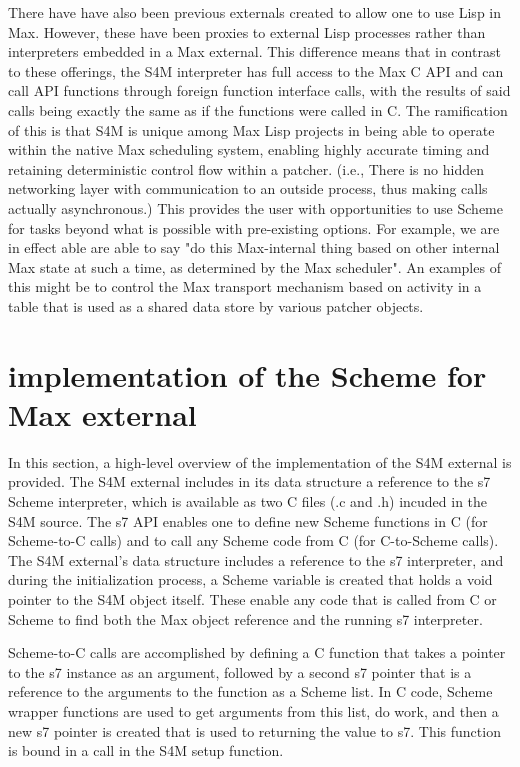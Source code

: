 \documentclass[acmsmall]{acmart}
\begin{document}
There have have also been previous externals created to allow one to use Lisp in Max. 
However, these have been proxies to external Lisp processes rather than interpreters embedded
in a Max external.
This difference means that in contrast to these offerings, the S4M interpreter has full 
access to the Max C API and can call API functions through foreign function interface
calls, with the results of said calls being exactly the same as if the functions were called in C. 
The ramification of this is that S4M is unique among Max Lisp projects in being
able to operate within the native Max scheduling system, enabling highly accurate
timing and retaining deterministic control flow within a patcher. (i.e., There
is no hidden networking layer with communication to an outside process, thus making
calls actually asynchronous.)
This provides the user with opportunities to use Scheme for tasks beyond
what is possible with pre-existing options. For example, we are in effect able 
are able to say "do this Max-internal thing based on other internal Max state at such a time,
as determined by the Max scheduler". An examples of this might be to control
the Max transport mechanism based on activity in a table that is used as a 
shared data store by various patcher objects. 


\section{implementation of the Scheme for Max external}

In this section, a high-level overview of the implementation of the S4M external is provided.
The S4M external includes in its data structure a reference to the s7 Scheme interpreter,
which is available as two C files (.c and .h) incuded in the S4M source. The s7 API
enables one to define new Scheme functions in C (for Scheme-to-C calls) and to call
any Scheme code from C (for C-to-Scheme calls). The S4M external's data structure
includes a reference to the s7 interpreter, and during the initialization process, a 
Scheme variable is created that holds a void pointer to the S4M object itself. These
enable any code that is called from C or Scheme to find both the Max object reference
and the running s7 interpreter.

Scheme-to-C calls are accomplished by defining a C function that takes 
a pointer to the s7 instance as an argument, followed by a second s7 pointer
that is a reference to the arguments to the function as a Scheme list. In C code,
Scheme wrapper functions are used to get arguments from this list, do work, and
then a new s7 pointer is created that is used to returning the value to s7.
This function is bound in a call in the S4M setup function.
\end{document}
